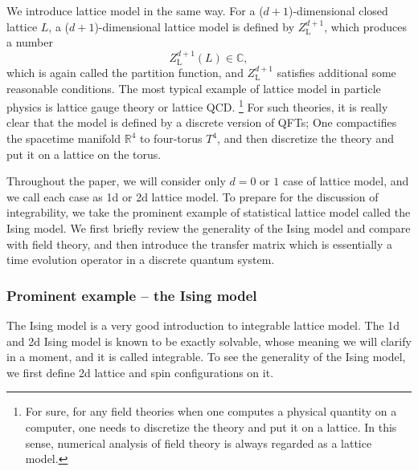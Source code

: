 We introduce lattice model in the same way. For a ($d+1$)-dimensional
closed lattice $L$, a ($d+1$)-dimensional lattice model is defined
by $Z_{\mathrm{L}}^{d+1}$, which produces a number
\begin{equation}
  Z_{\mathrm{L}}^{d+1}\left(L\right)  \in  \mathbb{C},
\end{equation}
which is again called the partition function, and $Z_{\mathrm{L}}^{d+1}$
satisfies additional some reasonable conditions. The most typical
example of lattice model in particle physics is lattice gauge theory
or lattice QCD.%
%
\footnote{For sure, for any field theories when one computes a physical quantity
on a computer, one needs to discretize the theory and put it on a
lattice. In this sense, numerical analysis of field theory is always
regarded as a lattice model. }
%
 For such theories, it is really clear that the model is defined by
a discrete version of QFTs; One compactifies the spacetime manifold
$\mathbb{R}^{4}$ to four-torus $T^{4}$, and then discretize the
theory and put it on a lattice on the torus.

Throughout the paper, we will consider only $d=0$ or $1$ case of
lattice model, and we call each case as 1d or 2d lattice model. To
prepare for the discussion of integrability, we take the prominent
example of statistical lattice model called the Ising model. We first
briefly review the generality of the Ising model and compare with
field theory, and then introduce the transfer matrix which is essentially
a time evolution operator in a discrete quantum system.





\subsubsection{Prominent example -- the Ising model}

The Ising model is a very good introduction to integrable lattice
model. The 1d and 2d Ising model is known to be exactly solvable,
whose meaning we will clarify in a moment, and it is called integrable.
To see the generality of the Ising model, we first define 2d lattice
and spin configurations on it.


